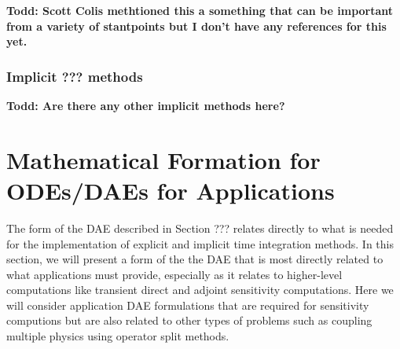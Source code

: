 \documentclass[pdf,ps2pdf,11pt]{SANDreport}
\begin{document}
{}\textbf{Todd: Scott Colis methtioned this a something that can be important
from a variety of stantpoints but I don't have any references for this yet.}

\subsubsection{Implicit ??? methods}

{}\textbf{Todd: Are there any other implicit methods here?}


\section{Mathematical Formation for ODEs/DAEs for Applications}

The form of the DAE described in Section ??? relates directly to what is
needed for the implementation of explicit and implicit time integration
methods.  In this section, we will present a form of the the DAE that is most
directly related to what applications must provide, especially as it relates
to higher-level computations like transient direct and adjoint sensitivity
computations.  Here we will consider application DAE formulations that are
required for sensitivity computions but are also related to other types of
problems such as coupling multiple physics using operator split methods.
\end{document}
